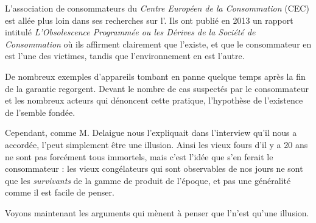 L'association de consommateurs du \textit{Centre Européen de la Consommation} (CEC) est allée plus loin dans ses recherches sur l'\op. Ils ont publié en 2013 un rapport intitulé \textit{L'Obsolescence Programmée ou les Dérives de la Société de Consommation} où ils affirment clairement que l'\op existe, et que le consommateur en est l'une des victimes, tandis que l'environnement en est l'autre. 

\medbreak

De nombreux exemples d'appareils tombant en panne quelque temps après la fin de la garantie regorgent. Devant le nombre de cas suspectés par le consommateur et les nombreux acteurs qui dénoncent cette pratique, l'hypothèse de l'existence de l'\op semble fondée. 

\bigbreak
Cependant, comme M. Delaigue nous l'expliquait dans l'interview qu'il nous a accordée, l'\op peut simplement être une illusion. Ainsi les vieux fours d'il y a 20 ans ne sont pas forcément tous immortels, mais c'est l'idée que s'en ferait le consommateur : les vieux congélateurs qui sont observables de nos jours ne sont que les \textit{survivants} de la gamme de produit de l'époque, et pas une généralité comme il est facile de penser. 


Voyons maintenant les arguments qui mènent à penser que l'\op n'est qu'une illusion. 
